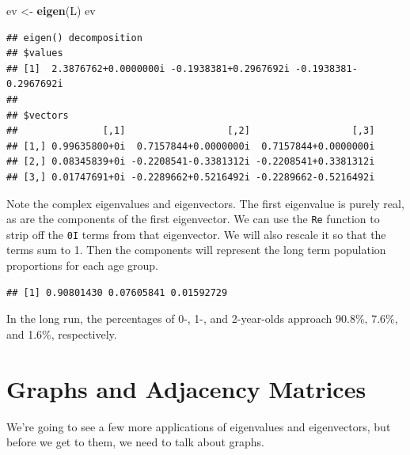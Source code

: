 \documentclass[
]{book}
\newenvironment{Shaded}{\begin{snugshade}}{\end{snugshade}}
\newcommand{\DecValTok}[1]{\textcolor[rgb]{0.00,0.00,0.81}{#1}}
\newcommand{\FunctionTok}[1]{\textcolor[rgb]{0.13,0.29,0.53}{\textbf{#1}}}
\newcommand{\NormalTok}[1]{#1}
\newcommand{\OtherTok}[1]{\textcolor[rgb]{0.56,0.35,0.01}{#1}}
\newcommand{\SpecialCharTok}[1]{\textcolor[rgb]{0.81,0.36,0.00}{\textbf{#1}}}
\theoremstyle{definition}
\theoremstyle{definition}
\theoremstyle{definition}
\theoremstyle{definition}
\theoremstyle{remark}
\begin{document}
\begin{Shaded}
\begin{Highlighting}[]
\NormalTok{ev }\OtherTok{\textless{}{-}} \FunctionTok{eigen}\NormalTok{(L)}
\NormalTok{ev}
\end{Highlighting}
\end{Shaded}

\begin{verbatim}
## eigen() decomposition
## $values
## [1]  2.3876762+0.0000000i -0.1938381+0.2967692i -0.1938381-0.2967692i
## 
## $vectors
##               [,1]                  [,2]                  [,3]
## [1,] 0.99635800+0i  0.7157844+0.0000000i  0.7157844+0.0000000i
## [2,] 0.08345839+0i -0.2208541-0.3381312i -0.2208541+0.3381312i
## [3,] 0.01747691+0i -0.2289662+0.5216492i -0.2289662-0.5216492i
\end{verbatim}

Note the complex eigenvalues and eigenvectors. The first eigenvalue is purely real, as are the components of the first eigenvector. We can use the \texttt{Re} function to strip off the \texttt{0I} terms from that eigenvector. We will also rescale it so that the terms sum to 1. Then the components will represent the long term population proportions for each age group.

\begin{Shaded}
\end{Shaded}

\begin{verbatim}
## [1] 0.90801430 0.07605841 0.01592729
\end{verbatim}

In the long run, the percentages of 0-, 1-, and 2-year-olds approach 90.8\%, 7.6\%, and 1.6\%, respectively.

\section{Graphs and Adjacency Matrices}\label{graphs-and-adjacency-matrices}

We're going to see a few more applications of eigenvalues and eigenvectors, but before we get to them, we need to talk about graphs.
\end{document}
